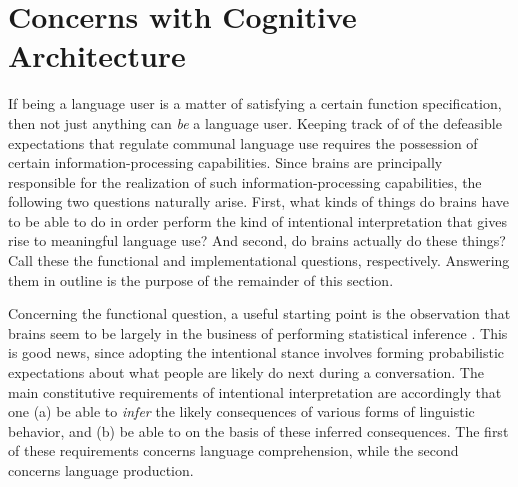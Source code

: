 \section{Concerns with Cognitive Architecture}

If being a language user is a matter of satisfying a certain function specification, then not just anything can \textit{be} a language user. Keeping track of of the defeasible expectations that regulate communal language use requires the possession of certain information-processing capabilities. Since brains are principally responsible for the realization of such information-processing capabilities, the following two questions naturally arise. First, what kinds of things do brains have to be able to do in order perform the kind of intentional interpretation that gives rise to meaningful language use? And second, do brains actually do these things? Call these the functional and implementational questions, respectively. Answering them in outline is the purpose of the remainder of this section. 

Concerning the functional question, a useful starting point is the observation that brains seem to be largely in the business of performing statistical inference \citep{Eliasmith:2007,clark:2013}. This is good news, since adopting the intentional stance involves forming probabilistic expectations about what people are likely do next during a conversation. The main constitutive requirements of intentional interpretation are accordingly that one (a) be able to \textit{infer} the likely consequences of various forms of linguistic behavior, and (b) be able to  on the basis of these inferred consequences. The first of these requirements concerns language comprehension, while the second concerns language production. 

